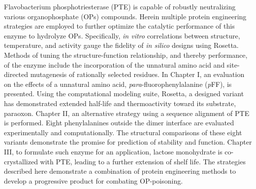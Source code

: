 % 
% 
%

Flavobacterium phosphotriesterase (PTE) is capable of robustly neutralizing
various organophosphate (OPs) compounds. Herein multiple protein engineering
strategies are employed to further optimize the catalytic performance of this
enzyme to hydrolyze OPs. Specifically, \emph{in vitro} correlations between structure,
temperature, and activity gauge the fidelity of \emph{in silico} designs using
Rosetta.  Methods of tuning the structure-function relationship, and thereby
performance, of the enzyme include the incorporation of the unnatural amino
acid and site-directed mutagenesis of rationally selected residues. In Chapter
I, an evaluation on the effects of a unnatural amino acid,
\emph{para}-fluorophenylalanine (\emph{p}FF), is presented.  Using the 
computational modeling suite, Rosetta, a designed variant has demonstrated
extended half-life and thermoactivity toward its substrate, paraoxon.  Chapter
II, an alternative strategy using a sequence alignment of PTE is performed.
Eight phenylalanines outside the dimer interface are evaluated experimentally
and computationally. The structural comparisons of these eight variants
demonstrate the promise for prediction of stability and function. Chapter III,
to formulate such enzyme for an application, lactose monohydrate is
co-crystallized with PTE, leading to a further extension of shelf life.  The
strategies described here demonstrate a combination of protein engineering
methods to develop a progressive product for combating OP-poisoning. 

